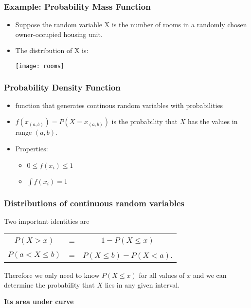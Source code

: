 \begin{frame}
\frametitle{Example: Probability Mass Function }

\begin{itemize}
\item Suppose the random variable X is the number of rooms in a 
randomly chosen owner-occupied housing unit. 
\item The distribution of X is: 

\begin{center}
\texttt{[image: rooms]}
\end{center}
\end{itemize}

\end{frame}


\begin{frame}
\frametitle{Probability Density Function }

\begin{itemize}
\item function that generates continous random variables with probabilities
\item $f(x_{(a,b)}) = P(X=x_{(a,b)})$ is the probability that $X$ has the values in range $(a,b)$.
\item Properties:
\begin{itemize}
\item $0\leq f(x_i)\leq1 $
\item $\int f(x_i) = 1$ 
\end{itemize}
\end{itemize}
\end{frame}

\begin{frame}
\frametitle{Distributions of continuous random variables}

Two important identities are

\begin{center}
\begin{tabular}{ccc}
$P(X>x)$ &=& $1 - P(X \le x)$\\ $P(a < X \le b)$ &=& $P(X\le b) -
  P(X < a)$.
\end{tabular}
\end{center}

Therefore we only need to know $P(X \le x)$ for all values of $x$ and
we can determine the probability that $X$ lies in any given interval.

{\bf Its area under curve}
\end{frame}

